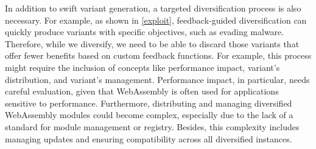In addition to swift variant generation, a targeted diversification process is also necessary. 
For example, as shown in \autoref{exploit}, feedback-guided diversification can quickly produce variants with specific objectives, such as evading malware. 
Therefore, while we diversify, we need to be able to discard those variants that offer fewer benefits based on custom feedback functions.
For example, this process might require the inclusion of concepts like performance impact, variant's distribution, and variant's management. 
Performance impact, in particular, needs careful evaluation, given that WebAssembly is often used for applications sensitive to performance. 
Furthermore, distributing and managing diversified WebAssembly modules could become complex, especially due to the lack of a standard for \Wasm module management or registry.
Besides, this complexity includes managing updates and ensuring compatibility across all diversified instances.

